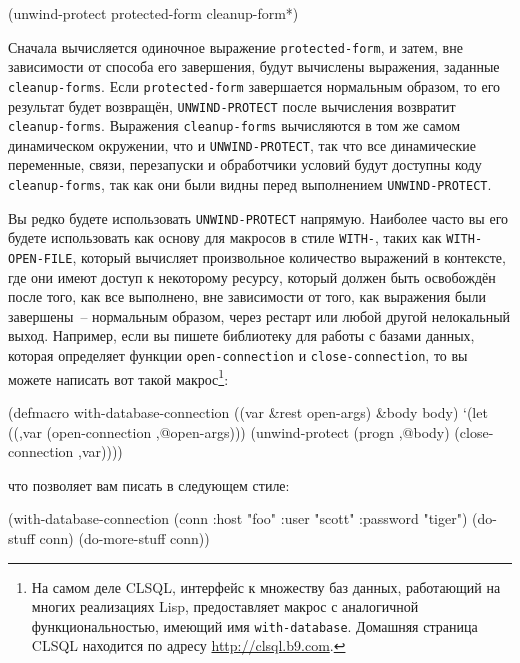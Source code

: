 \begin{myverb}
(unwind-protect protected-form
  cleanup-form*)
\end{myverb}

Сначала вычисляется одиночное выражение \lstinline{protected-form}, и затем, вне зависимости от
способа его завершения, будут вычислены выражения, заданные \lstinline{cleanup-forms}.  Если
\lstinline{protected-form} завершается нормальным образом, то его результат будет возвращён,
\lstinline{UNWIND-PROTECT} после вычисления возвратит \lstinline{cleanup-forms}. Выражения
\lstinline{cleanup-forms} вычисляются в том же самом динамическом окружении, что и
\lstinline{UNWIND-PROTECT}, так что все динамические переменные, связи, перезапуски и
обработчики условий будут доступны коду \lstinline{cleanup-forms}, так как они были видны
перед выполнением \lstinline{UNWIND-PROTECT}.

Вы редко будете использовать \lstinline{UNWIND-PROTECT} напрямую.  Наиболее часто вы его
будете использовать как основу для макросов в стиле \lstinline{WITH-}, таких как
\lstinline{WITH-OPEN-FILE}, который вычисляет произвольное количество выражений в контексте,
где они имеют доступ к некоторому ресурсу, который должен быть освобождён после того, как
все выполнено, вне зависимости от того, как выражения были завершены~-- нормальным
образом, через рестарт или любой другой нелокальный выход.  Например, если вы пишете
библиотеку для работы с базами данных, которая определяет функции \lstinline{open-connection} и
\lstinline{close-connection}, то вы можете написать вот такой макрос\footnote{На самом
  деле CLSQL, интерфейс к множеству баз данных, работающий на многих реализациях Lisp,
  предоставляет макрос с аналогичной функциональностью, имеющий имя \lstinline{with-database}.
  Домашняя страница CLSQL находится по адресу \url{http://clsql.b9.com}.}:

\begin{myverb}
(defmacro with-database-connection ((var &rest open-args) &body body)
  `(let ((,var (open-connection ,@open-args)))
    (unwind-protect (progn ,@body)
      (close-connection ,var))))
\end{myverb}

\noindent{}что позволяет вам писать в следующем стиле:

\begin{myverb}
(with-database-connection (conn :host "foo" :user "scott" :password "tiger")
  (do-stuff conn)
  (do-more-stuff conn))
\end{myverb}

